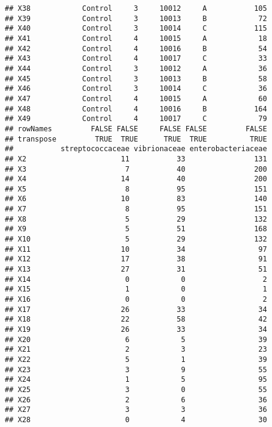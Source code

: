 \documentclass[12pt]{beamer}\usepackage[]{graphicx}\usepackage[]{color}
\makeatletter
\newenvironment{kframe}{%
 \def\at@end@of@kframe{}%
 \ifinner\ifhmode%
  \def\at@end@of@kframe{\end{minipage}}%
  \begin{minipage}{\columnwidth}%
 \fi\fi%
 \def\FrameCommand##1{\hskip\@totalleftmargin \hskip-\fboxsep
 \colorbox{shadecolor}{##1}\hskip-\fboxsep
     \hskip-\linewidth \hskip-\@totalleftmargin \hskip\columnwidth}%
 \MakeFramed {\advance\hsize-\width
   \@totalleftmargin\z@ \linewidth\hsize
   \@setminipage}}%
 {\par\unskip\endMakeFramed%
 \at@end@of@kframe}
\newenvironment{knitrout}{}{} %
\makeatother
\begin{document}
\begin{frame}[fragile]
\begin{knitrout}
\begin{kframe}
\begin{verbatim}
## X38            Control     3     10012     A           105
## X39            Control     3     10013     B            72
## X40            Control     3     10014     C           115
## X41            Control     4     10015     A            18
## X42            Control     4     10016     B            54
## X43            Control     4     10017     C            33
## X44            Control     3     10012     A            36
## X45            Control     3     10013     B            58
## X46            Control     3     10014     C            36
## X47            Control     4     10015     A            60
## X48            Control     4     10016     B           164
## X49            Control     4     10017     C            79
## rowNames         FALSE FALSE     FALSE FALSE         FALSE
## transpose         TRUE  TRUE      TRUE  TRUE          TRUE
##           streptococcaceae vibrionaceae enterobacteriaceae
## X2                      11           33                131
## X3                       7           40                200
## X4                      14           40                200
## X5                       8           95                151
## X6                      10           83                140
## X7                       8           95                151
## X8                       5           29                132
## X9                       5           51                168
## X10                      5           29                132
## X11                     10           34                 97
## X12                     17           38                 91
## X13                     27           31                 51
## X14                      0            0                  2
## X15                      1            0                  1
## X16                      0            0                  2
## X17                     26           33                 34
## X18                     22           58                 42
## X19                     26           33                 34
## X20                      6            5                 39
## X21                      2            3                 23
## X22                      5            1                 39
## X23                      3            9                 55
## X24                      1            5                 95
## X25                      3            0                 55
## X26                      2            6                 36
## X27                      3            3                 36
## X28                      0            4                 30

\end{verbatim}
\end{kframe}
\end{knitrout}
\end{frame}
\end{document}
